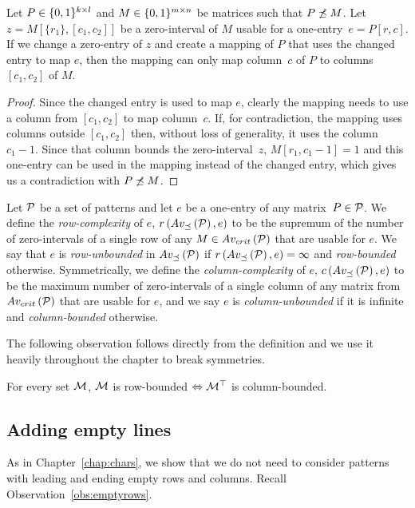 \begin{obs}
Let $P\in\{0,1\}^{k\times l}$ and $M\in\{0,1\}^{m\times n}$ be matrices such that $P\not\preceq M$. Let $z=M[\{r_1\},[c_1,c_2]]$ be a zero-interval of $M$ usable for a one-entry~$e=P[r,c]$. If we change a zero-entry of $z$ and create a mapping of $P$ that uses the changed entry to map $e$, then the mapping can only map column~$c$ of $P$ to columns $[c_1,c_2]$ of $M$. 
\end{obs}
\begin{proof}
Since the changed entry is used to map $e$, clearly the mapping needs to use a column from $[c_1,c_2]$ to map column~$c$. If, for contradiction, the mapping uses columns outside $[c_1,c_2]$ then, without loss of generality, it uses the column $c_1-1$. Since that column bounds the zero-interval~$z$, $M[r_1,c_1-1]=1$ and this one-entry can be used in the mapping instead of the changed entry, which gives us a contradiction with $P\not\preceq M$.
\end{proof}

\begin{defn}
Let $\mathcal{P}$ be a set of patterns and let $e$ be a one-entry of any matrix~$P\in\mathcal{P}$. We define the \emph{row-complexity} of $e$, $r\left(Av_{\preceq}\left(\mathcal{P}\right),e\right)$ to be the supremum of the number of zero-intervals of a single row of any $M\in Av_{crit}\left(\mathcal{P}\right)$ that are usable for $e$. We say that $e$ is \emph{row-unbounded} in $Av_{\preceq}\left(\mathcal{P}\right)$ if $r\left(Av_{\preceq}\left(\mathcal{P}\right),e\right)=\infty$ and \emph{row-bounded} otherwise. Symmetrically, we define the \emph{column-complexity} of $e$, $c\left(Av_{\preceq}\left(\mathcal{P}\right),e\right)$ to be the maximum number of zero-intervals of a single column of any matrix from $Av_{crit}\left(\mathcal{P}\right)$ that are usable for $e$, and  we say $e$ is \emph{column-unbounded} if it is infinite and \emph{column-bounded} otherwise.
\end{defn}

The following observation follows directly from the definition and we use it heavily throughout the chapter to break symmetries.

\begin{obs}
\label{obs:transposebounded}
For every set $\mathcal{M}$, $\mathcal{M}$ is row-bounded $\Leftrightarrow\mathcal{M}^\top$ is column-bounded.
\end{obs}

\subsection{Adding empty lines}
As in Chapter~\ref{chap:chars}, we show that we do not need to consider patterns with leading and ending empty rows and columns. Recall Observation~\ref{obs:emptyrows}.

